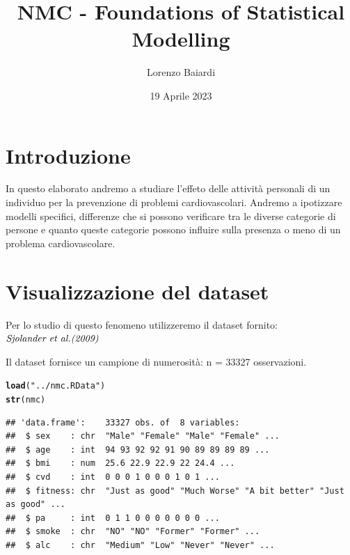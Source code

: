 \documentclass{article}\usepackage[]{graphicx}\usepackage[]{xcolor}
\title{NMC - Foundations of Statistical Modelling}
\author{Lorenzo Baiardi}
\date{19 Aprile 2023}
\makeatletter
\newcommand{\hlstr}[1]{\textcolor[rgb]{0.192,0.494,0.8}{#1}}%
\newcommand{\hlstd}[1]{\textcolor[rgb]{0.345,0.345,0.345}{#1}}%
\newcommand{\hlkwd}[1]{\textcolor[rgb]{0.737,0.353,0.396}{\textbf{#1}}}%
\newenvironment{kframe}{%
 \def\at@end@of@kframe{}%
 \ifinner\ifhmode%
  \def\at@end@of@kframe{\end{minipage}}%
  \begin{minipage}{\columnwidth}%
 \fi\fi%
 \def\FrameCommand##1{\hskip\@totalleftmargin \hskip-\fboxsep
 \colorbox{shadecolor}{##1}\hskip-\fboxsep
     \hskip-\linewidth \hskip-\@totalleftmargin \hskip\columnwidth}%
 \MakeFramed {\advance\hsize-\width
   \@totalleftmargin\z@ \linewidth\hsize
   \@setminipage}}%
 {\par\unskip\endMakeFramed%
 \at@end@of@kframe}
\newenvironment{knitrout}{}{} %
\makeatother
\begin{document}
\maketitle

\clearpage

\tableofcontents

\clearpage


\section{Introduzione}
  In questo elaborato andremo a studiare l'effeto delle attività personali di un 
  individuo per la prevenzione di problemi cardiovascolari. Andremo a ipotizzare
  modelli specifici, differenze che si possono verificare tra le diverse categorie
  di persone e quanto queste categorie possono influire sulla presenza o meno
  di un problema cardiovascolare.


\section{Visualizzazione del dataset} 
  Per lo studio di questo fenomeno utilizzeremo il dataset fornito: 
  $\emph{Sjolander et al.(2009)}$ \par
  Il dataset fornisce un campione di numerosità: n = 33327 osservazioni. 
  
\begin{knitrout}
\color{fgcolor}\begin{kframe}
\begin{alltt}
\hlkwd{load}\hlstd{(}\hlstr{"../nmc.RData"}\hlstd{)}
\hlkwd{str}\hlstd{(nmc)}
\end{alltt}
\begin{verbatim}
## 'data.frame':	33327 obs. of  8 variables:
##  $ sex    : chr  "Male" "Female" "Male" "Female" ...
##  $ age    : int  94 93 92 92 91 90 89 89 89 89 ...
##  $ bmi    : num  25.6 22.9 22.9 22 24.4 ...
##  $ cvd    : int  0 0 0 1 0 0 0 1 0 1 ...
##  $ fitness: chr  "Just as good" "Much Worse" "A bit better" "Just as good" ...
##  $ pa     : int  0 1 1 0 0 0 0 0 0 0 ...
##  $ smoke  : chr  "NO" "NO" "Former" "Former" ...
##  $ alc    : chr  "Medium" "Low" "Never" "Never" ...
\end{verbatim}
\end{kframe}
\end{knitrout}
 
\end{document}
